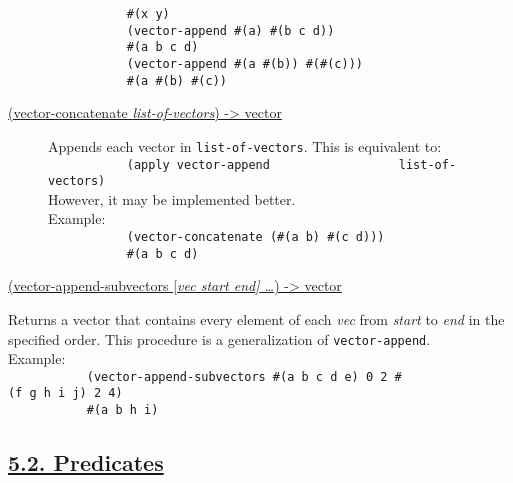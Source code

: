 \begin{description}
\texttt{\ \ \ \ \ \ \ \ \ \ \ \#(x\ y)\ \ \ \ \ \ \ \ \ }\\[2\baselineskip]\texttt{\ \ \ \ \ \ \ \ \ \ \ (vector-append\ \textquotesingle{}\#(a)\ \textquotesingle{}\#(b\ c\ d))\ \ \ \ \ \ \ \ \ }\\
\texttt{\ \ \ \ \ \ \ \ \ \ \ \#(a\ b\ c\ d)\ \ \ \ \ \ \ \ \ }\\[2\baselineskip]\texttt{\ \ \ \ \ \ \ \ \ \ \ (vector-append\ \textquotesingle{}\#(a\ \#(b))\ \textquotesingle{}\#(\#(c)))\ \ \ \ \ \ \ \ \ }\\
\texttt{\ \ \ \ \ \ \ \ \ \ \ \#(a\ \#(b)\ \#(c))\ \ \ \ \ \ \ \ \ }\\[2\baselineskip]
\item[ \href{}{(vector-concatenate \emph{list-of-vectors})
-\textgreater{} vector} ]
Appends each vector in \texttt{list-of-vectors}. This is equivalent
to:\\[2\baselineskip]\texttt{\ \ \ \ \ \ \ \ \ \ \ (apply\ vector-append\ \ \ \ \ \ \ \ \ \ \ \ \ \ \ \ \ \ list-of-vectors)\ \ \ \ \ \ \ \ \ }\\[2\baselineskip]However,
it may be implemented
better.\\[2\baselineskip]Example:\\[2\baselineskip]\texttt{\ \ \ \ \ \ \ \ \ \ \ (vector-concatenate\ \textquotesingle{}(\#(a\ b)\ \#(c\ d)))\ \ \ \ \ \ \ \ \ }\\
\texttt{\ \ \ \ \ \ \ \ \ \ \ \#(a\ b\ c\ d)\ \ \ \ \ \ \ \ \ }\\[2\baselineskip]
\end{description}

\href{}{(vector-append-subvectors {[}\emph{vec start end{]} \ldots{}})
-\textgreater{} vector}

Returns a vector that contains every element of each \emph{vec} from
\emph{start} to \emph{end} in the specified order. This procedure is a
generalization of
\texttt{vector-append}.\\[2\baselineskip]Example:\\[2\baselineskip]\texttt{\ \ \ \ \ \ \ \ \ \ \ (vector-append-subvectors\ \textquotesingle{}\#(a\ b\ c\ d\ e)\ 0\ 2\ \textquotesingle{}\#(f\ g\ h\ i\ j)\ 2\ 4)\ \ \ \ \ \ \ \ \ }\\
\texttt{\ \ \ \ \ \ \ \ \ \ \ \#(a\ b\ h\ i)\ \ \ \ \ \ \ \ \ }\\[2\baselineskip]

\subsection{\texorpdfstring{\href{}{5.2.
Predicates}}{5.2. Predicates}}\label{predicates}

